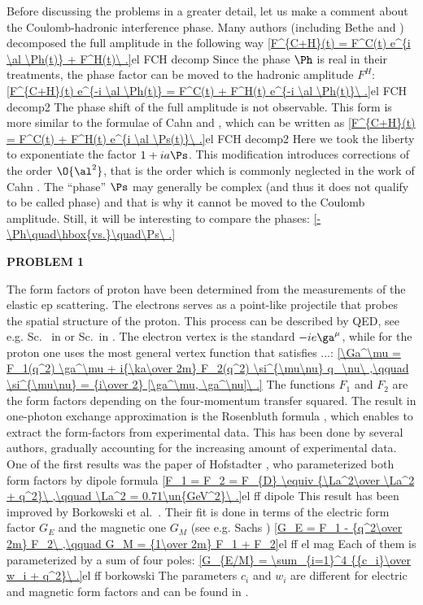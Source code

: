 Before discussing the problems in a greater detail, let us make a comment about the Coulomb-hadronic interference phase. Many authors (including Bethe  and \WY{} ) decomposed the full amplitude in the following way
\eqref{F^{C+H}(t) = F^C(t) e^{i \al \Ph(t)} + F^H(t)\ .}{el FCH decomp}
Since the phase $\Ph$ is real in their treatments, the phase factor can be moved to the hadronic amplitude $F^H$:
\eqref{F^{C+H}(t) e^{-i \al \Ph(t)} = F^C(t) + F^H(t) e^{-i \al \Ph(t)}\ .}{el FCH decomp2}
The phase shift of the full amplitude is not observable. This form is more similar to the formulae of Cahn  and \KL{} , which can be written as
\eqref{F^{C+H}(t) = F^C(t) + F^H(t) e^{i \al \Ps(t)}\ .}{el FCH decomp2}
Here we took the liberty to exponentiate the factor $1+ia\Ps$. This modification introduces corrections of the order $\O{\al^2}$, that is the order which is commonly neglected in the work of Cahn . The ``phase'' $\Ps$ may generally be complex (and thus it does not qualify to be called phase) and that is why it cannot be moved to the Coulomb amplitude. Still, it will be interesting to compare the phases:
\eqref{-\Ph\quad\hbox{vs.}\quad\Ps\ .}{}

{\bf PROBLEM 1}

The form factors of proton have been determined from the measurements of the elastic ep scattering. The electrons serves as a point-like projectile that probes the spatial structure of the proton. This process can be described by QED, see e.g. Sc. ~in  or Sc.~in . The electron vertex is the standard $-ie\ga^\mu$, while for the proton one uses the most general vertex function that satisfies ...:
\eqref{\Ga^\mu = F_1(q^2) \ga^\mu + i{\ka\over 2m} F_2(q^2) \si^{\mu\nu} q_\nu\ ,\qquad \si^{\mu\nu} = {i\over 2} [\ga^\mu, \ga^\nu]\ .}{}
The functions $F_1$ and $F_2$ are the form factors depending on the four-momentum transfer squared. The result in one-photon exchange approximation is the Rosenbluth formula , which enables to extract the form-factors from experimental data. This has been done by several authors, gradually accounting for the increasing amount of experimental data. One of the first results was the paper of Hofstadter , who parameterized both form factors by dipole formula
\eqref{F_1 = F_2 = F_{D} \equiv {\La^2\over \La^2 + q^2}\ ,\qquad \La^2 = 0.71\un{GeV^2}\ .}{el ff dipole}
This result has been improved by Borkowski et al.~. Their fit is done in terms of the electric form factor $G_E$ and the magnetic one $G_M$ (see e.g. Sachs )
\eqref{G_E = F_1 - {q^2\over 2m} F_2\ ,\qquad G_M = {1\over 2m} F_1 + F_2}{el ff el mag}
Each of them is parameterized by a sum of four poles:
\eqref{G_{E/M} = \sum_{i=1}^4 {{c_i}\over w_i + q^2}\ .}{el ff borkowski}
The parameters $c_i$ and $w_i$ are different for electric and magnetic form factors and can be found in .

